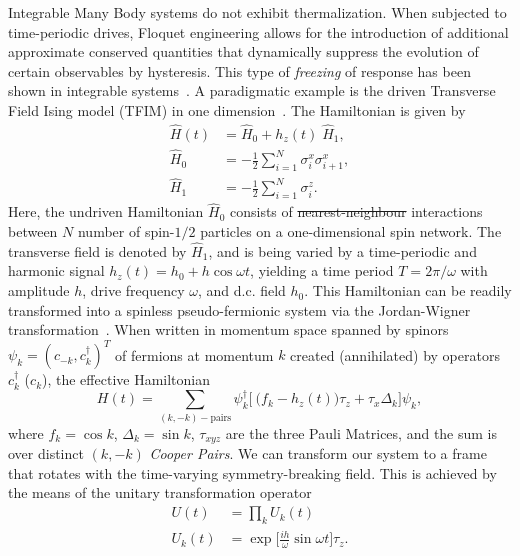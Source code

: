 \documentclass[%
reprint,
superscriptaddress,
amsmath,amssymb,
aps,
prb,
showkeys,
]{revtex4-2}
\providecommand{\DIFaddtex}[1]{{\protect\color{blue}\uwave{#1}}} %
\providecommand{\DIFdeltex}[1]{{\protect\color{red}\sout{#1}}}                      %
\providecommand{\DIFaddbegin}{} %
\providecommand{\DIFaddend}{} %
\providecommand{\DIFdelbegin}{} %
\providecommand{\DIFdelend}{} %
\providecommand{\DIFadd}[1]{\texorpdfstring{\DIFaddtex{#1}}{#1}} %
\providecommand{\DIFdel}[1]{\texorpdfstring{\DIFdeltex{#1}}{}} %
\newcommand{\DIFscaledelfig}{0.5}
\newlength{\DIFdelgraphicswidth} %
\newlength{\DIFdelgraphicsheight} %
\newcommand{\DIFaddincludegraphics}[2][]{{\color{blue}\fbox{\DIFOincludegraphics[#1]{#2}}}} %
\newcommand{\DIFdelincludegraphics}[2][]{%
\sbox{\DIFdelgraphicsbox}{\DIFOincludegraphics[#1]{#2}}%
\settoboxwidth{\DIFdelgraphicswidth}{\DIFdelgraphicsbox} %
\settoboxtotalheight{\DIFdelgraphicsheight}{\DIFdelgraphicsbox} %
\scalebox{\DIFscaledelfig}{%
\parbox[b]{\DIFdelgraphicswidth}{\usebox{\DIFdelgraphicsbox}\\[-\baselineskip] \rule{\DIFdelgraphicswidth}{0em}}\llap{\resizebox{\DIFdelgraphicswidth}{\DIFdelgraphicsheight}{%
\setlength{\unitlength}{\DIFdelgraphicswidth}%
\begin{picture}(1,1)%
\thicklines\linethickness{2pt} %
{\color[rgb]{1,0,0}\put(0,0){\framebox(1,1){}}}%
{\color[rgb]{1,0,0}\put(0,0){\line( 1,1){1}}}%
{\color[rgb]{1,0,0}\put(0,1){\line(1,-1){1}}}%
\end{picture}%
}\hspace*{3pt}}} %
} %
\DeclareRobustCommand{\DIFaddbegin}{\DIFOaddbegin \let\includegraphics\DIFaddincludegraphics} %
\DeclareRobustCommand{\DIFaddend}{\DIFOaddend \let\includegraphics\DIFOincludegraphics} %
\DeclareRobustCommand{\DIFdelbegin}{\DIFOdelbegin \let\includegraphics\DIFdelincludegraphics} %
\DeclareRobustCommand{\DIFdelend}{\DIFOaddend \let\includegraphics\DIFOincludegraphics} %
\begin{document}
Integrable Many Body systems do not exhibit thermalization. When subjected to time-periodic drives, Floquet engineering allows for the introduction of additional approximate conserved quantities that dynamically suppress the evolution of certain observables by hysteresis. This type of \textit{freezing} of response
has been shown in integrable systems~\cite{roy_fate_2015}.
A paradigmatic example is  the driven Transverse Field Ising model (TFIM) in one dimension~\cite{stinchcombe_ising_1973}. The Hamiltonian is given by
\begin{align}
	\label{eq:tfim:hamilt}
	\hat{H}(t) &= \hat{H}_0 + h_z(t) \; \hat{H}_1,\\
	\hat{H}_0 &= -\frac{1}{2}\sum^N_{i=1} \sigma^x_i \sigma^x_{i+1},\\
	\hat{H}_1 &= -\frac{1}{2}\sum_{i=1}^N \sigma^z_{i}.
\end{align}
Here, the undriven Hamiltonian $\hat{H}_0$ consists of \DIFdelbegin \DIFdel{nearest-neighbour }\DIFdelend \DIFaddbegin \DIFadd{nearest-neighbor }\DIFaddend interactions between $N$ number of  spin-$1/2$ particles on a one-dimensional spin network. The transverse field is denoted by $\hat{H}_1$, and is being varied by a time-periodic and harmonic signal $h_z(t) = h_0 + h\cos{\omega t}$, yielding a time period $T=2\pi/\omega$ with amplitude $h$, drive frequency $\omega$, and d.c. field $h_0$. This Hamiltonian can be readily transformed into a spinless pseudo-fermionic system via the Jordan-Wigner transformation~\cite{mbeng_quantum_2020}. When written in momentum space spanned by spinors $\psi_k = (c_{-k}, c^\dagger_k)^T$ of fermions at momentum $k$ created (annihilated) by operators $c^\dagger_k$ ($c_k$), the effective Hamiltonian
\begin{equation}
	\label{eq:TFIM:fermions}
	H(t) = \sum_{(k,-k)-\mbox{pairs}} \psi^\dagger_k
	\Bigg[\ \bigg(f_k - h_z(t)\bigg)\tau_z +  \tau_x \Delta_k\Bigg]\psi_k ,
\end{equation}
where $f_k = \cos{k}$, $\Delta_k = \sin{k}$, $\tau_{xyz}$ are the three Pauli Matrices, and the sum is over distinct $(k, -k)$ \textit{Cooper Pairs}. We can transform our system to a frame that rotates with the time-varying symmetry-breaking field. This is achieved by the means of the unitary transformation operator~\cite{Engelhardt2013}
\begin{align}
	\label{eq:rotation:tfim}
	U(t) &= \prod_k U_k(t)\\
	U_k(t) &= \exp{\Big[\frac{i h}{\omega}\sin{\omega t}\Big]\tau_z}.\nonumber
\end{align} 
\end{document}

